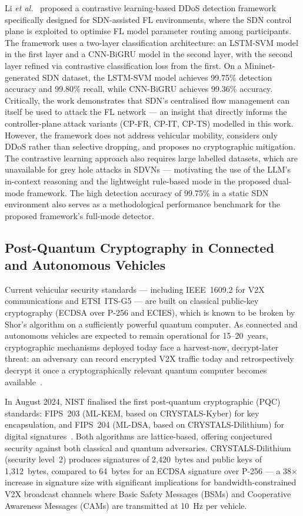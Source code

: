 \documentclass[12pt, a4paper]{report}
\begin{document}
Li \textit{et al.}~\cite{li2025ddos} proposed a contrastive learning-based
DDoS detection framework specifically designed for SDN-assisted FL environments,
where the SDN control plane is exploited to optimise FL model parameter
routing among participants. The framework uses a two-layer classification
architecture: an LSTM-SVM model in the first layer and a CNN-BiGRU model
in the second layer, with the second layer refined via contrastive
classification loss from the first. On a Mininet-generated SDN dataset,
the LSTM-SVM model achieves 99.75\% detection accuracy and 99.80\% recall,
while CNN-BiGRU achieves 99.36\% accuracy. Critically, the work demonstrates
that SDN's centralised flow management can itself be used to attack the FL
network — an insight that directly informs the controller-plane attack
variants (CP-FR, CP-IT, CP-TS) modelled in this work. However, the
framework does not address vehicular mobility, considers only DDoS rather
than selective dropping, and proposes no cryptographic mitigation. The
contrastive learning approach also requires large labelled datasets, which
are unavailable for grey hole attacks in SDVNs — motivating the use of
the LLM's in-context reasoning and the lightweight rule-based mode in
the proposed dual-mode framework. The high detection accuracy of 99.75\%
in a static SDN environment also serves as a methodological performance
benchmark for the proposed framework's full-mode detector.

\subsection{Post-Quantum Cryptography in Connected and Autonomous Vehicles}
\label{sec:lit_pqc_cav}

Current vehicular security standards — including IEEE~1609.2 for V2X
communications and ETSI~ITS-G5 — are built on classical public-key
cryptography (ECDSA over P-256 and ECIES), which is known to be broken
by Shor's algorithm on a sufficiently powerful quantum computer. As
connected and autonomous vehicles are expected to remain operational for
15--20~years, cryptographic mechanisms deployed today face a
harvest-now, decrypt-later threat: an adversary can record encrypted
V2X traffic today and retrospectively decrypt it once a
cryptographically relevant quantum computer becomes
available~\cite{nist2024fips203}.

In August 2024, NIST finalised the first post-quantum cryptographic
(PQC) standards: FIPS~203 (ML-KEM, based on CRYSTALS-Kyber) for key
encapsulation, and FIPS~204 (ML-DSA, based on CRYSTALS-Dilithium) for
digital signatures~\cite{nist2024fips203,nist2024fips204}. Both
algorithms are lattice-based, offering conjectured security against both
classical and quantum adversaries. CRYSTALS-Dilithium (security
level~2) produces signatures of 2,420~bytes and public keys of
1,312~bytes, compared to 64~bytes for an ECDSA signature over
P-256 — a 38$\times$ increase in signature size with significant
implications for bandwidth-constrained V2X broadcast channels where
Basic Safety Messages (BSMs) and Cooperative Awareness Messages (CAMs)
are transmitted at 10~Hz per vehicle.
\end{document}
